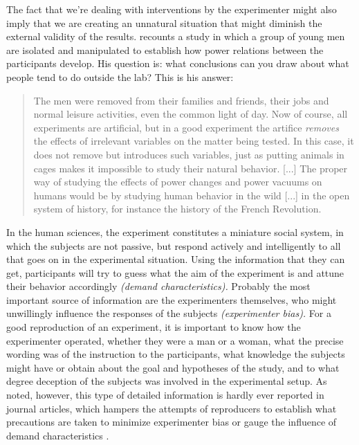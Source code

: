 \documentclass[twocolumn, serif, authordate, reflection]{jote-article}
\begin{document}
 The fact that we're dealing with interventions by the experimenter might also imply that we are creating an unnatural situation that might diminish the external validity of the results. \textcite{Collier2005} recounts a study in which a group of young men are isolated and manipulated to establish how power relations between the participants develop. His question is: what conclusions can you draw about what people tend to do outside the lab? This is his answer: 

\begin{quote}
The men were removed from their families and friends, their jobs and normal leisure activities, even the common light of day. Now of course, all experiments are artificial, but in a good experiment the artifice \textit{removes }the effects of irrelevant variables on the matter being tested. In this case, it does not remove but introduces such variables, just as putting animals in cages makes it impossible to study their natural behavior. [...] The proper way of studying the effects of power changes and power vacuums on humans would be by studying human behavior in the wild [...] in the open system of history, for instance the history of the French Revolution. \parencite[p. 332]{Collier2005}

\end{quote}

In the human sciences, the experiment constitutes a miniature social system, in which the subjects are not passive, but respond actively and intelligently to all that goes on in the experimental situation. Using the information that they can get, participants will try to guess what the aim of the experiment is and attune their behavior accordingly \textit{(demand characteristics). }Probably the most important source of information are the experimenters themselves, who might unwillingly influence the responses of the subjects \textit{(experimenter bias). }For a good reproduction of an experiment, it is important to know how the experimenter operated, whether they were a man or a woman, what the precise wording was of the instruction to the participants, what knowledge the subjects might have or obtain about the goal and hypotheses of the study, and to what degree deception of the subjects was involved in the experimental setup. As noted, however, this type of detailed information is hardly ever reported in journal articles, which hampers the attempts of reproducers to establish what precautions are taken to minimize experimenter bias or gauge the influence of demand characteristics \parencite{Klein2012}.
\end{document}
